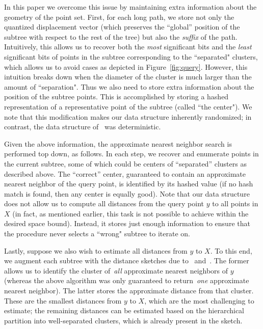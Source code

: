 In this paper we overcome this issue by maintaining extra information about the geometry of the point set. First, for each long path, we store not only the quantized displacement vector (which preserves the ``global'' position of the subtree with respect to the rest of the tree) but also the {\em suffix} of the path. Intuitively, this allows us to recover both the {\em most} significant bits and the {\em least} significant bits of  points in the subtree corresponding to the ``separated" clusters, which allows us to avoid cases as depicted in Figure~\ref{fig:query}. However, this intuition breaks down when the diameter of the cluster is much larger than the amount of ``separation".  Thus we also need to store extra information about the position of the subtree points. This is accomplished by storing a hashed representation of a representative point of the subtree (called ``the center"). We note that this modification makes our data structure inherently randomized; in contrast, the data structure of~\cite{indyk2017near} was deterministic.

Given the above information, the approximate nearest neighbor search is performed top down, as follows. In each step, we recover and enumerate points  in the current subtree, some of which could be centers of ``separated'' clusters as described above. The ``correct'' center, guaranteed to contain an approximate nearest neighbor of the query point, is identified by its hashed value (if no hash match is found, then any center is equally good). Note that our data structure does not allow us to compute all distances from the query point $y$ to all points in $X$ (in fact, as mentioned earlier, this task is not possible to achieve within the desired space bound). Instead, it stores just enough information to ensure that the procedure never selects a ``wrong" subtree to iterate on.

Lastly, suppose we also wish to estimate all distances from $y$ to $X$.
To this end, we augment each subtree with the distance sketches due to~\cite{kushilevitz2000efficient} and~\cite{johnson1984extensions}.
The former allows us to identify the cluster of~\emph{all} approximate nearest neighbors of $y$ (whereas the above algorithm was only guaranteed to return~\emph{one} approximate nearest neighbor).
The latter stores the approximate distance from that cluster.
These are the smallest distances from $y$ to $X$, which are the most challenging to estimate; the remaining distances can be estimated based on the hierarchical partition into well-separated clusters, which is already present in the sketch.

